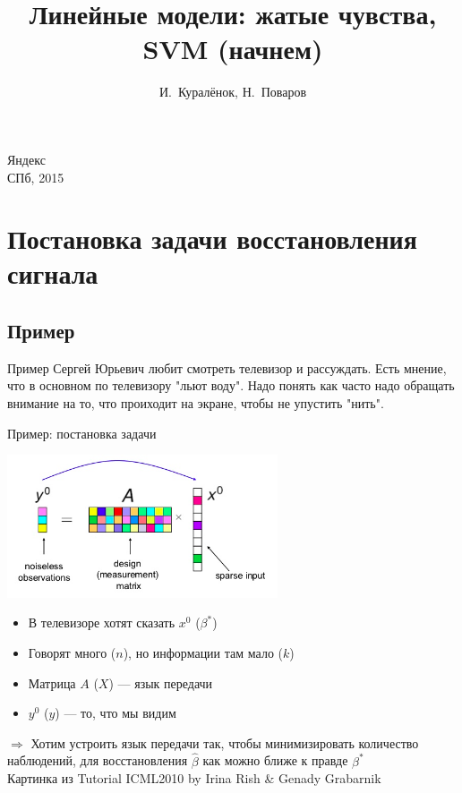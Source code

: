\documentclass[14pt, fleqn, xcolor={dvipsnames, table}]{beamer}
\title{Линейные модели: жатые чувства, SVM (начнем)\\\small{}}
\author[]{\small{%
И.~Куралёнок,
Н.~Поваров}}
\date{}
\begin{document}
\begin{frame}

\maketitle
\small
\begin{center}
\vspace{-60pt}
\normalsize {\color{red}Я}ндекс \\
\vspace{80pt}
\footnotesize СПб, 2015
\end{center}
\end{frame}

\section{Постановка задачи восстановления сигнала}
\subsection{Пример}
\begin{frame}{Пример}
Сергей Юрьевич любит смотреть телевизор и рассуждать. Есть мнение, что в основном по телевизору "льют воду".
Надо понять как часто надо обращать внимание на то, что проиходит на экране, чтобы не упустить "нить".
\end{frame}
\begin{frame}{Пример: постановка задачи}
\begin{center}
\includegraphics[width=0.6\textwidth]{CS-ProblemSetup-1.png}
\end{center}
\vspace{-2em}
\small
\begin{itemize}
  \item В телевизоре хотят сказать $x^0$ ($\beta^*$)
  \item Говорят много ($n$), но информации там мало ($k$)
  \item Матрица $A$ ($X$) --- язык передачи
  \item $y^0$ ($y$) --- то, что мы видим
\end{itemize}
\footnotesize
$\Rightarrow$ Хотим устроить язык передачи так, чтобы минимизировать количество наблюдений, для восстановления $\hat{\beta}$ как можно ближе к правде $\beta^*$\\
\tiny Картинка из Tutorial ICML2010 by Irina Rish \& Genady Grabarnik
\end{frame}
\end{document}
